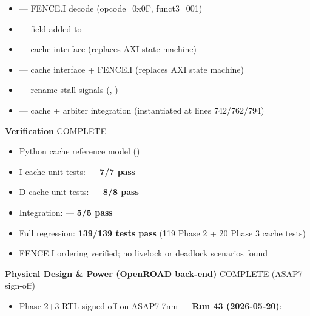\begin{record}
\begin{itemize}
  \begin{itemize}
  \tightlist
  \item
    \ok{}  --- FENCE.I decode (opcode=0x0F,
    funct3=001)
  \item
    \ok{}  ---  field added to
  \item
    \ok{}  --- cache interface (replaces AXI
    state machine)
  \item
    \ok{}  --- cache interface + FENCE.I
    (replaces AXI state machine)
  \item
    \ok{}  --- rename stall signals
    (, )
  \item
    \ok{}  --- cache + arbiter integration
    (instantiated at lines 742/\allowbreak{}762/\allowbreak{}794)
  \end{itemize}
\end{itemize}

\textbf{Verification} \ok{} COMPLETE

\begin{itemize}
\tightlist
\item
  \ok{} Python cache reference model ()
\item
  \ok{} I-cache unit tests:  ---
  \textbf{7/7 pass}
\item
  \ok{} D-cache unit tests:  ---
  \textbf{8/8 pass}
\item
  \ok{} Integration:  ---
  \textbf{5/5 pass}
\item
  \ok{} Full regression: \textbf{139/139 tests pass} (119 Phase 2 + 20
  Phase 3 cache tests)
\item
  \ok{} FENCE.I ordering verified; no livelock or deadlock scenarios
  found
\end{itemize}

\textbf{Physical Design \& Power (OpenROAD back-end)} \ok{} COMPLETE
(ASAP7 sign-off)

\begin{itemize}
\tightlist
\item
  \ok{} Phase 2+3 RTL signed off on ASAP7 7nm --- \textbf{Run 43
  (2026-05-20)}:


\end{itemize}
\end{record}
